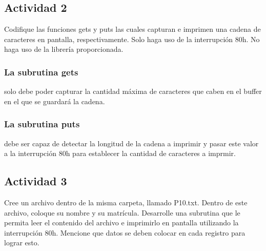 \documentclass[12pt]{article}
\begin{document}
\subsection*{Actividad 2}
\label{sec:org17563ff}
Codifique las funciones gets y puts las cuales capturan e imprimen una 
cadena de caracteres en pantalla, respectivamente. Solo haga uso de la 
interrupción 80h. No haga uso de la librería proporcionada.

\subsubsection*{La subrutina gets}
\label{sec:org27f40c4}
solo debe poder capturar la cantidad máxima de caracteres que caben en
el buffer en el que se guardará la cadena.

\subsubsection*{La subrutina puts}
\label{sec:orgb34df49}
debe ser capaz de detectar la longitud de la cadena a imprimir y pasar
este valor a la interrupción 80h para establecer la cantidad de 
caracteres a imprmir.

\subsection*{Actividad 3}
\label{sec:org9927aa1}
Cree un archivo dentro de la misma carpeta, llamado P10.txt. Dentro de
este archivo, coloque su nombre y su matrícula. Desarrolle una subrutina
que le permita leer el contenido del archivo e imprimirlo en pantalla
utilizando la interrupción 80h. Mencione que datos se deben colocar en
cada registro para lograr esto. 
\end{document}
